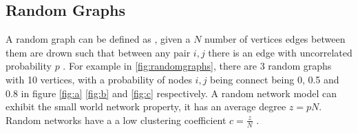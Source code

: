  \subsection{Random Graphs} A random graph can be defined as , given a $N$ number of vertices edges between them are drown such that between any pair $i,j$ there is an edge with uncorrelated probability $p$ \citep{newman2002random}.
 For example in \ref{fig:randomgraphs}, there are 3 random graphs with 10 vertices, with a probability of nodes $i,j$ being connect being 0, 0.5 and 0.8 in figure \ref{fig:a} \ref{fig:b} and \ref{fig:c} respectively. A random network model can exhibit the small world network property,
it has an average degree $z= pN$.
Random networks have a a low clustering coefficient $ c = \frac{z}{N}$ \citep{newman2003structure}.



